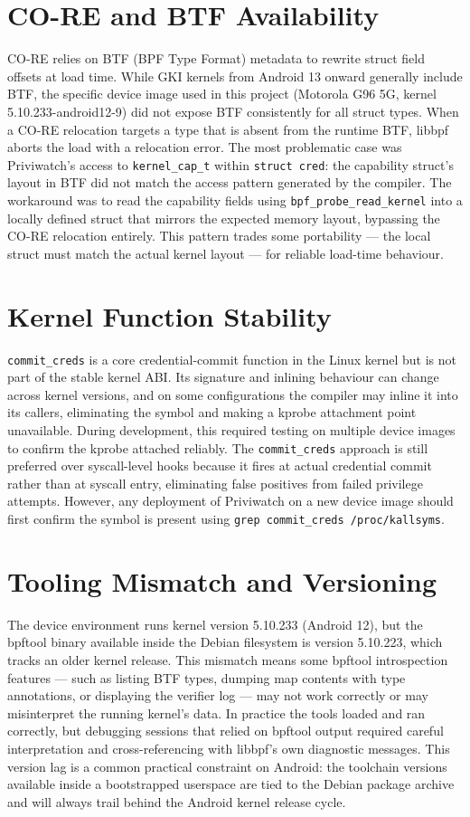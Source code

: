 \documentclass{mnitjaipur}
\begin{document}
\section{CO-RE and BTF Availability}
CO-RE relies on BTF (BPF Type Format) metadata to rewrite struct field offsets at load time. While GKI kernels from Android 13 onward generally include BTF, the specific device image used in this project (Motorola G96 5G, kernel 5.10.233-android12-9) did not expose BTF consistently for all struct types. When a CO-RE relocation targets a type that is absent from the runtime BTF, libbpf aborts the load with a relocation error. The most problematic case was Priviwatch's access to \texttt{kernel\_cap\_t} within \texttt{struct cred}: the capability struct's layout in BTF did not match the access pattern generated by the compiler. The workaround was to read the capability fields using \texttt{bpf\_probe\_read\_kernel} into a locally defined struct that mirrors the expected memory layout, bypassing the CO-RE relocation entirely. This pattern trades some portability — the local struct must match the actual kernel layout — for reliable load-time behaviour.

\section{Kernel Function Stability}
\texttt{commit\_creds} is a core credential-commit function in the Linux kernel but is not part of the stable kernel ABI. Its signature and inlining behaviour can change across kernel versions, and on some configurations the compiler may inline it into its callers, eliminating the symbol and making a kprobe attachment point unavailable. During development, this required testing on multiple device images to confirm the kprobe attached reliably. The \texttt{commit\_creds} approach is still preferred over syscall-level hooks because it fires at actual credential commit rather than at syscall entry, eliminating false positives from failed privilege attempts. However, any deployment of Priviwatch on a new device image should first confirm the symbol is present using \texttt{grep commit\_creds /proc/kallsyms}.

\section{Tooling Mismatch and Versioning}
The device environment runs kernel version 5.10.233 (Android 12), but the bpftool binary available inside the Debian filesystem is version 5.10.223, which tracks an older kernel release. This mismatch means some bpftool introspection features — such as listing BTF types, dumping map contents with type annotations, or displaying the verifier log — may not work correctly or may misinterpret the running kernel's data. In practice the tools loaded and ran correctly, but debugging sessions that relied on bpftool output required careful interpretation and cross-referencing with libbpf's own diagnostic messages. This version lag is a common practical constraint on Android: the toolchain versions available inside a bootstrapped userspace are tied to the Debian package archive and will always trail behind the Android kernel release cycle.
\end{document}
